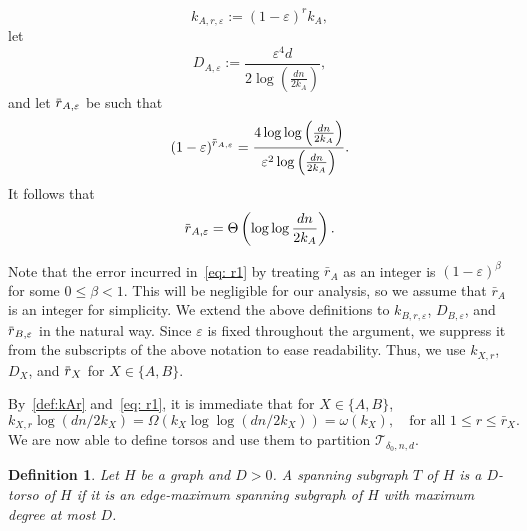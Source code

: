 \documentclass[11pt]{article}
\newcommand{\overbar}[1]{\mkern 1.5mu\overline{\mkern-1.5mu#1\mkern-1.5mu}\mkern 1.5mu}
\theoremstyle{plain}
\newtheorem{definition}[thm]{Definition}
\begin{document}
\begin{equation}
k_{A,r, \varepsilon} := (1- \varepsilon)^rk_A,\label{def:kAr}
\end{equation}
let
\begin{equation}\label{eq: D}
    D_{A, \varepsilon} := \frac{\varepsilon^4d}{2\log\left(\frac{dn}{2k_A}\right)},
\end{equation}
and let $\overbar{r}_{A, \varepsilon}$ be such that
\begin{equation}\label{eq: r1}
    (1-\varepsilon)^{\overbar{r}_{A,\varepsilon}} = \frac{4\log\log\left( \frac{dn}{2k_A} \right)}{\varepsilon^2\log\left( \frac{dn}{2k_A} \right)}.
\end{equation}
It follows that
\begin{equation}\label{eq: r asymtotics}
    \overbar{r}_{A, \varepsilon} = \Theta\left(\log\log\frac{dn}{2k_A}\right).
\end{equation}



Note that the error incurred in~\eqref{eq: r1} by treating $\bar r_A$ as an integer is $(1-\varepsilon)^\beta$ for some $0 \leq \beta < 1$. This will be negligible for our analysis, so we assume that $\bar r_A$ is an integer for simplicity. We extend the above definitions to $k_{B,r, \varepsilon}$, $D_{B, \varepsilon}$,  and $\overbar{r}_{B, \varepsilon}$ in the natural way. Since $\varepsilon$ is fixed throughout the argument, we suppress it from the subscripts of the above notation to ease readability. Thus, we use $k_{X,r}$, $D_{X}$,  and $\overbar{r}_{X}$ for $X\in \{A,B\}$.

By~\eqref{def:kAr} and~\eqref{eq: r1}, it is immediate that for $X\in \{A,B\}$,
\begin{equation}
\label{eq:k'bound}    k_{X,r}\log(dn/2k_X)=\Omega(k_X\log\log (dn/2k_X))= \omega(k_X),\quad \text{for all $1\le r\le \bar r_X$}.
\end{equation}
We are now able to define torsos and use them to partition $\mathcal T_{\delta_0, n, d}$.


\begin{definition}
Let $H$ be a graph and $D>0$. A spanning subgraph $T$ of $H$ is a $D$-torso of $H$ if it is an edge-maximum spanning subgraph of $H$ with maximum degree at most $D$.     
\end{definition}
\end{document}
